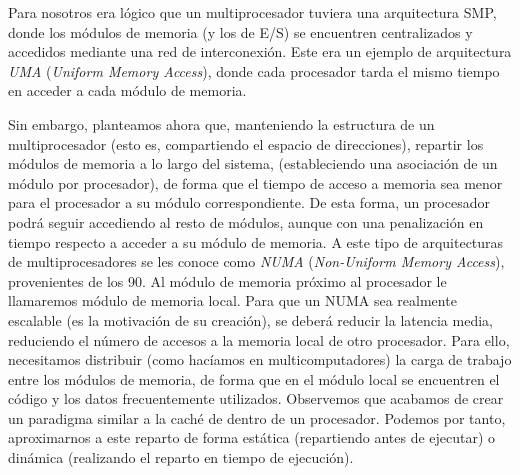Para nosotros era lógico que un multiprocesador tuviera una arquitectura SMP, donde los módulos de memoria (y los de E/S) se encuentren centralizados y accedidos mediante una red de interconexión. Este era un ejemplo de arquitectura \emph{UMA} (\emph{Uniform Memory Access}), donde cada procesador tarda el mismo tiempo en acceder a cada módulo de memoria.

Sin embargo, planteamos ahora que, manteniendo la estructura de un multiprocesador (esto es, compartiendo el espacio de direcciones), repartir los módulos de memoria a lo largo del sistema, (estableciendo una asociación de un módulo por procesador), de forma que el tiempo de acceso a memoria sea menor para el procesador a su módulo correspondiente. De esta forma, un procesador podrá seguir accediendo al resto de módulos, aunque con una penalización en tiempo respecto a acceder a su módulo de memoria. A este tipo de arquitecturas de multiprocesadores se les conoce como \emph{NUMA} (\emph{Non-Uniform Memory Access}), provenientes de los 90. Al módulo de memoria próximo al procesador le llamaremos módulo de memoria local. Para que un NUMA sea realmente escalable (es la motivación de su creación), se deberá reducir la latencia media, reduciendo el número de accesos a la memoria local de otro procesador. Para ello, necesitamos distribuir (como hacíamos en multicomputadores) la carga de trabajo entre los módulos de memoria, de forma que en el módulo local se encuentren el código y los datos frecuentemente utilizados. Observemos que acabamos de crear un paradigma similar a la caché de dentro de un procesador. Podemos por tanto, aproximarnos a este reparto de forma estática (repartiendo antes de ejecutar) o dinámica (realizando el reparto en tiempo de ejecución).\\

